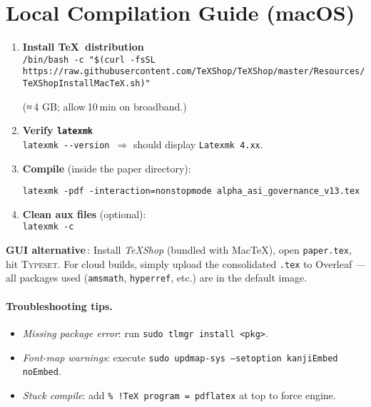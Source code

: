 \documentclass[11pt]{article}
\theoremstyle{plain}
\begin{document}
\section{Local Compilation Guide (macOS)}\label{sec:compile}

\begin{enumerate}\itemsep2pt
\item \textbf{Install \TeX\ distribution}\\[2pt]
      \verb|/bin/bash -c "$(curl -fsSL https://raw.githubusercontent.com/TeXShop/TeXShop/master/Resources/TeXShopInstallMacTeX.sh)"|

      (≈\,4 GB; allow 10 min on broadband.)

\item \textbf{Verify \texttt{latexmk}}\\
      \verb|latexmk --version| \,$\Rightarrow$ should display \verb|Latexmk 4.xx|.

\item \textbf{Compile} (inside the paper directory):\\
\begin{verbatim}
latexmk -pdf -interaction=nonstopmode alpha_asi_governance_v13.tex
\end{verbatim}

\item \textbf{Clean aux files} (optional):\\
      \verb|latexmk -c|
\end{enumerate}

\noindent\textbf{GUI alternative}\,: Install \textit{TeXShop} (bundled with Mac\TeX),
open \texttt{paper.tex}, hit \textsc{Typeset}.  
For cloud builds, simply upload the consolidated \texttt{.tex} to Overleaf — all
packages used (\texttt{amsmath}, \texttt{hyperref}, etc.) are in the default image.

\paragraph{Troubleshooting tips.}
\begin{itemize}\itemsep2pt
\item \emph{Missing package error}: run \texttt{sudo tlmgr install <pkg>}.  
\item \emph{Font-map warnings}: execute \texttt{sudo updmap-sys --setoption kanjiEmbed noEmbed}.
\item \emph{Stuck compile}: add \texttt{\% !TeX program = pdflatex} at top to force engine.
\end{itemize}
\end{document}
